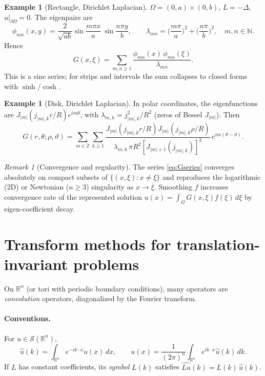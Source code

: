 \documentclass[11pt]{article}
\theoremstyle{definition}
\newtheorem{example}[theorem]{Example}
\theoremstyle{remark}
\newtheorem{remark}[theorem]{Remark}
\begin{document}
	\begin{example}[Rectangle, Dirichlet Laplacian]
		$\Omega=(0,a)\times(0,b)$, $L=-\Delta$, $u|_{\partial\Omega}=0$. The eigenpairs are
		\[
		\phi_{mn}(x,y)=\frac{2}{\sqrt{ab}}\sin\!\frac{m\pi x}{a}\ \sin\!\frac{n\pi y}{b},\qquad
		\lambda_{mn}=\Big(\frac{m\pi}{a}\Big)^2+\Big(\frac{n\pi}{b}\Big)^2,\quad m,n\in\mathbb{N}.
		\]
		Hence
		\[
		G(x,\xi)=\sum_{m,n\ge1}\frac{\phi_{mn}(x)\,\phi_{mn}(\xi)}{\lambda_{mn}}.
		\]
		This is a sine series; for strips and intervals the sum collapses to closed forms with $\sinh/\cosh$.
	\end{example}
	
	\begin{example}[Disk, Dirichlet Laplacian]
		In polar coordinates, the eigenfunctions are $J_{|m|}(j_{|m|,k} r/R)e^{im\theta}$,
		with $\lambda_{m,k}=j_{|m|,k}^2/R^2$ (zeros of Bessel $J_{|m|}$). Then
		\[
		G(r,\theta;\rho,\vartheta)=\sum_{m\in\mathbb{Z}}\sum_{k\ge1}
		\frac{J_{|m|}(j_{|m|,k}r/R)J_{|m|}(j_{|m|,k}\rho/R)}{\lambda_{m,k}\, \pi R^2 [J_{|m|+1}(j_{|m|,k})]^2}
		\,e^{im(\theta-\vartheta)}.
		\]
	\end{example}
	
	\begin{remark}[Convergence and regularity]
		The series \eqref{eq:Gseries} converges absolutely on compact subsets of $\{(x,\xi):x\neq \xi\}$
		and reproduces the logarithmic (2D) or Newtonian ($n\ge3$) singularity as $x\to\xi$.
		Smoothing $f$ increases convergence rate of the represented solution
		$u(x)=\int_\Omega G(x,\xi)f(\xi)\,d\xi$ by eigen-coefficient decay.
	\end{remark}
	
	\section{Transform methods for translation-invariant problems}
	\label{sec:transforms}
	
	On $\mathbb{R}^n$ (or tori with periodic boundary conditions), many operators are \emph{convolution}
	operators, diagonalized by the Fourier transform.
	
	\paragraph{Conventions.}
	For $u\in\mathcal{S}(\mathbb{R}^n)$,
	\[
	\widehat{u}(k)=\int_{\mathbb{R}^n} e^{-ik\cdot x}u(x)\,dx,\qquad
	u(x)=\frac{1}{(2\pi)^n}\int_{\mathbb{R}^n} e^{ik\cdot x}\widehat{u}(k)\,dk.
	\]
	If $L$ has constant coefficients, its \emph{symbol} $L(k)$ satisfies
	$\widehat{Lu}(k)=L(k)\,\widehat{u}(k)$.
	
\end{document}
